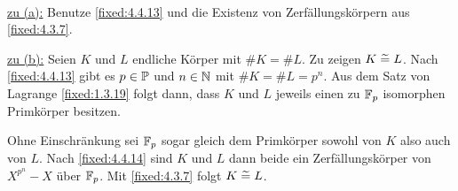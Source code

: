 \proof ~

\underline{zu (a):} Benutze \ref{fixed:4.4.13} und die Existenz von Zerfällungskörpern aus \ref{fixed:4.3.7}.

\underline{zu (b):} Seien $K$ und $L$ endliche Körper mit $\#K = \#L$. Zu zeigen $K \eqtilde L$. Nach \ref{fixed:4.4.13} gibt es $p \in \P$ und $n \in \N$ mit $\#K = \#L = p^n$. Aus dem Satz von Lagrange \ref{fixed:1.3.19} folgt dann, dass $K$ und $L$ jeweils einen zu $\F_p$ isomorphen Primkörper besitzen.

Ohne Einschränkung sei $\F_p$ sogar gleich dem Primkörper sowohl von $K$ also auch von $L$. Nach \ref{fixed:4.4.14} sind $K$ und $L$ dann beide ein Zerfällungskörper von $X^{p^n}-X$ über $\F_p$. Mit \ref{fixed:4.3.7} folgt $K \eqtilde L$.